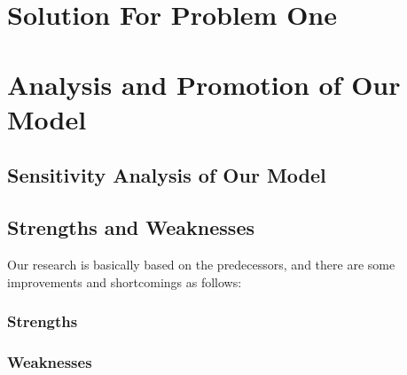 \documentclass[12pt]{article}  %
\begin{document}
\section{Solution For Problem One}





\newpage
\section{Analysis and Promotion of Our Model}
\subsection{Sensitivity Analysis of Our Model}
\subsection{Strengths and Weaknesses}
Our research is basically based on the predecessors, and there are some improvements and shortcomings as follows:
\subsubsection{Strengths}
\subsubsection{Weaknesses}
\end{document}
